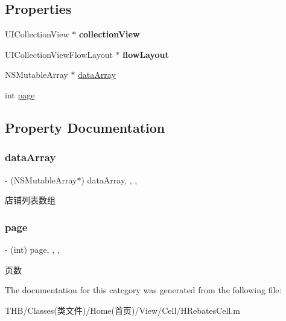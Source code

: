 \subsection*{Properties}
\begin{DoxyCompactItemize}
\item 
\mbox{\label{category_h_rebates_cell_07_08_a5ddc281179d5db0c748c8b421e2325b0}} 
U\+I\+Collection\+View $\ast$ {\bfseries collection\+View}
\item 
\mbox{\label{category_h_rebates_cell_07_08_a5f2ed4aba5c32409730f595135bb399e}} 
U\+I\+Collection\+View\+Flow\+Layout $\ast$ {\bfseries flow\+Layout}
\item 
N\+S\+Mutable\+Array $\ast$ \mbox{\hyperlink{category_h_rebates_cell_07_08_acef651eab96efb26445373e90d77fd0e}{data\+Array}}
\item 
int \mbox{\hyperlink{category_h_rebates_cell_07_08_a124ce063555b3cb8d9d18ceb95415bcd}{page}}
\end{DoxyCompactItemize}


\subsection{Property Documentation}
\mbox{\label{category_h_rebates_cell_07_08_acef651eab96efb26445373e90d77fd0e}} 
\subsubsection{\texorpdfstring{data\+Array}{dataArray}}
{\footnotesize\ttfamily -\/ (N\+S\+Mutable\+Array$\ast$) data\+Array\hspace{0.3cm}{\ttfamily [read]}, {\ttfamily [write]}, {\ttfamily [nonatomic]}, {\ttfamily [strong]}}

店铺列表数组 \mbox{\label{category_h_rebates_cell_07_08_a124ce063555b3cb8d9d18ceb95415bcd}} 
\subsubsection{\texorpdfstring{page}{page}}
{\footnotesize\ttfamily -\/ (int) page\hspace{0.3cm}{\ttfamily [read]}, {\ttfamily [write]}, {\ttfamily [nonatomic]}, {\ttfamily [assign]}}

页数 

The documentation for this category was generated from the following file\+:\begin{DoxyCompactItemize}
\item 
T\+H\+B/\+Classes(类文件)/\+Home(首页)/\+View/\+Cell/H\+Rebates\+Cell.\+m\end{DoxyCompactItemize}
